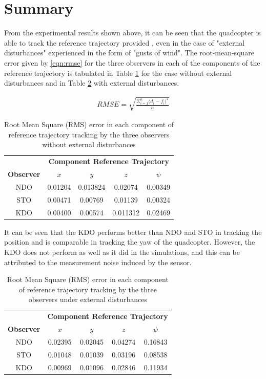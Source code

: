 \documentclass[letterpaper%
, twoside%
, 12pt%
,memoire%
, english%
,creativecommons,hyperref%
]{thETS}
\theoremstyle{newThmStyle}
\begin{document}
\section{Summary}
From the experimental results shown above, it can be seen that the quadcopter is able to track the reference trajectory provided , even in the case of  "external disturbances" experienced in the form of "gusts of wind". The root-mean-square error given by \eqref{eqn:rmse} for the three observers in each of the components of the reference trajectory is tabulated in Table \ref{Tab:rmse} for the case without external disturbances and in Table \ref{Tab:rmseDist} with external disturbances. 

\begin{align}\label{eqn:rmse}
 RMSE = \sqrt{\frac{\Sigma_{i=1}^{n}{\big({d_i -f_i}\big)^2}}{n}}
\end{align}

\begin{table}
\parbox{0.65\textwidth}{\caption{Root Mean Square (RMS) error in each component of reference trajectory tracking by the three observers without external disturbances}\label{Tab:rmse}}
\begin{tabular}{|c|c|c|c|c|}
\hline
         & \multicolumn{4}{c|}{\textbf{Component Reference Trajectory}}\\\cline{2-5} 
\textbf{Observer} &   $x$   &  $y$     &   $z$    & $\psi$  \\ \hline
NDO      & 0.01204 & 0.013824 & 0.02074  & 0.00349 \\
STO      & 0.00471 & 0.00769  & 0.01139   & 0.00324 \\
KDO      & 0.00400 & 0.00574  & 0.011312 & 0.02469 \\
\hline
\end{tabular}
\end{table}

It can be seen that the KDO performs better than NDO and STO in tracking the position and is comparable in tracking the yaw of the quadcopter. However, the KDO does not perform as well as it did in the simulations, and this can be attributed to the measurement noise induced by the sensor. 

\begin{table}
\parbox{0.65\textwidth}{\caption{Root Mean Square (RMS) error in each component of reference trajectory tracking by the three observers under external disturbances}\label{Tab:rmseDist}}
\begin{tabular}{|c|c|c|c|c|}
\hline
         & \multicolumn{4}{c|}{\textbf{Component Reference Trajectory}}\\\cline{2-5} 
\textbf{Observer} &   $x$   &  $y$     &   $z$    & $\psi$  \\ \hline
NDO      & 0.02395 & 0.02045  & 0.04274  & 0.16843 \\
STO      & 0.01048 & 0.01039  & 0.03196  & 0.08538 \\
KDO      & 0.00969 & 0.01096  & 0.02846  & 0.11934 \\
\hline
\end{tabular}
\end{table}
\end{document}
